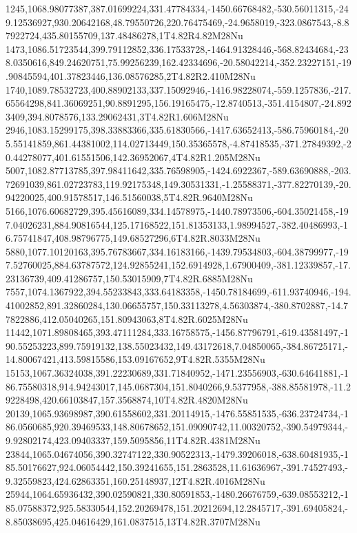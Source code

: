 1245,1068.98077387,387.01699224,331.47784334,-1450.66768482,-530.56011315,-249.12536927,930.20642168,48.79550726,220.76475469,-24.9658019,-323.0867543,-8.87922724,435.80155709,137.48486278,1T4.82R4.82M28Nu
1473,1086.51723544,399.79112852,336.17533728,-1464.91328446,-568.82434684,-238.0350616,849.24620751,75.99256239,162.42334696,-20.58042214,-352.23227151,-19.90845594,401.37823446,136.08576285,2T4.82R2.410M28Nu
1740,1089.78532723,400.88902133,337.15092946,-1416.98228074,-559.1257836,-217.65564298,841.36069251,90.8891295,156.19165475,-12.8740513,-351.4154807,-24.8923409,394.8078576,133.29062431,3T4.82R1.606M28Nu
2946,1083.15299175,398.33883366,335.61830566,-1417.63652413,-586.75960184,-205.55141859,861.44381002,114.02713449,150.35365578,-4.87418535,-371.27849392,-20.44278077,401.61551506,142.36952067,4T4.82R1.205M28Nu
5007,1082.87713785,397.98411642,335.76598905,-1424.6922367,-589.63690888,-203.72691039,861.02723783,119.92175348,149.30531331,-1.25588371,-377.82270139,-20.94220025,400.91578517,146.51560038,5T4.82R.9640M28Nu
5166,1076.60682729,395.45616089,334.14578975,-1440.78973506,-604.35021458,-197.04026231,884.90816544,125.17168522,151.81353133,1.98994527,-382.40486993,-16.75741847,408.98796775,149.68527296,6T4.82R.8033M28Nu
5880,1077.10120163,395.76783667,334.16183166,-1439.79534803,-604.38799977,-197.52760025,884.63787572,124.92855241,152.6914928,1.67900409,-381.12339857,-17.23136739,409.41286757,150.53015909,7T4.82R.6885M28Nu
7557,1074.1367922,394.55233843,333.64183358,-1450.78184699,-611.93740946,-194.41002852,891.32860284,130.06655757,150.33113278,4.56303874,-380.8702887,-14.77822886,412.05040265,151.80943063,8T4.82R.6025M28Nu
11442,1071.89808465,393.47111284,333.16758575,-1456.87796791,-619.43581497,-190.55253223,899.75919132,138.55023432,149.43172618,7.04850065,-384.86725171,-14.80067421,413.59815586,153.09167652,9T4.82R.5355M28Nu
15153,1067.36324038,391.22230689,331.71840952,-1471.23556903,-630.64641881,-186.75580318,914.94243017,145.0687304,151.8040266,9.5377958,-388.85581978,-11.29228498,420.66103847,157.3568874,10T4.82R.4820M28Nu
20139,1065.93698987,390.61558602,331.20114915,-1476.55851535,-636.23724734,-186.0560685,920.39469533,148.80678652,151.09090742,11.00320752,-390.54979344,-9.92802174,423.09403337,159.5095856,11T4.82R.4381M28Nu
23844,1065.04674056,390.32747122,330.90522313,-1479.39206018,-638.60481935,-185.50176627,924.06054442,150.39241655,151.2863528,11.61636967,-391.74527493,-9.32559823,424.62863351,160.25148937,12T4.82R.4016M28Nu
25944,1064.65936432,390.02590821,330.80591853,-1480.26676759,-639.08553212,-185.07588372,925.58330544,152.20269478,151.20212694,12.2845717,-391.69405824,-8.85038695,425.04616429,161.0837515,13T4.82R.3707M28Nu
